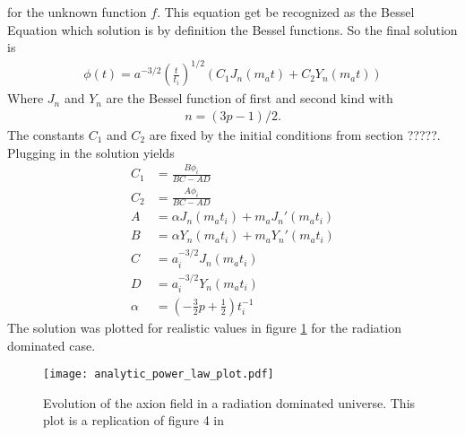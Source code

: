 \documentclass[a4paper]{article}
\begin{document}
for the unknown function $f$.
This equation get be recognized as the Bessel Equation which solution is by definition
the Bessel functions.
So the final solution is
\begin{align}
    \label{eq:power_law_solution}
    \phi(t) = a^{-3/2} \left(\frac{t}{t_i}\right)^{1/2}\left(C_1 J_n(m_a t) + C_2 Y_n(m_a t)\right)
\end{align}
Where $J_n$ and $Y_n$ are the Bessel function of first and second kind with
\begin{align}
    n = (3p - 1) / 2.
\end{align}
The constants $C_1$ and $C_2$ are fixed by the initial conditions from section ?????.
Plugging in the solution yields
\begin{align*}
    C_1 &= \frac{B \phi_i}{BC - AD} \\
    C_2 &= \frac{A \phi_i}{BC - AD} \\
    A &= \alpha J_n(m_a t_i) + m_a J_n'(m_a t_i) \\
    B &= \alpha Y_n(m_a t_i) + m_a Y_n'(m_a t_i) \\
    C &= a_i^{-3/2} J_n(m_a t_i) \\
    D &= a_i^{-3/2} Y_n(m_a t_i) \\
    \alpha &= (-\frac{3}{2} p + \frac{1}{2}) t_i^{-1}
\end{align*}
The solution was plotted for realistic values in figure \ref{fig:rad_dom_ax_field} for the radiation dominated case.
\begin{figure}
    \centering
    \texttt{[image: analytic\_power\_law\_plot.pdf]}
    \caption{Evolution of the axion field in a radiation dominated universe. This plot is a replication of figure 4 in \cite{MarshAxionCosmo}}
    \label{fig:rad_dom_ax_field}
\end{figure}
\end{document}
